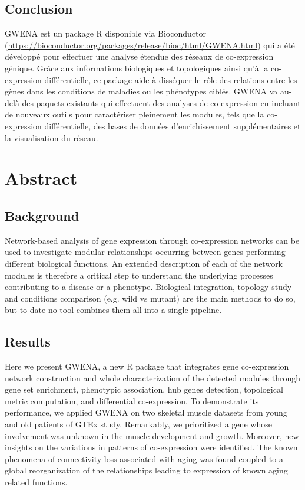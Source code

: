 \subsection{Conclusion}
GWENA est un package R disponible via Bioconductor (\url{https://bioconductor.org/packages/release/bioc/html/GWENA.html}) qui a été développé pour effectuer une analyse étendue des réseaux de co-expression génique. Grâce aux informations biologiques et topologiques ainsi qu'à la co-expression différentielle, ce package aide à disséquer le rôle des relations entre les gènes dans les conditions de maladies ou les phénotypes ciblés. GWENA va au-delà des paquets existants qui effectuent des analyses de co-expression en incluant de nouveaux outils pour caractériser pleinement les modules, tels que la co-expression différentielle, des bases de données d'enrichissement supplémentaires et la visualisation du réseau.



\section{Abstract}
\subsection{Background}
Network-based analysis of gene expression through co-expression networks can be used to investigate modular relationships occurring between genes performing different biological functions. An extended description of each of the network modules is therefore a critical step to understand the underlying processes contributing to a disease or a phenotype. Biological integration, topology study and conditions comparison (e.g. wild vs mutant) are the main methods to do so, but to date no tool combines them all into a single pipeline.

\subsection{Results}
Here we present GWENA, a new R package that integrates gene co-expression network construction and whole characterization of the detected modules through gene set enrichment, phenotypic association, hub genes detection, topological metric computation, and differential co-expression. To demonstrate its performance, we applied GWENA on two skeletal muscle datasets from young and old patients of GTEx study. Remarkably, we prioritized a gene whose involvement was unknown in the muscle development and growth. Moreover, new insights on the variations in patterns of co-expression were identified. The known phenomena of connectivity loss associated with aging was found coupled to a global reorganization of the relationships leading to expression of known aging related functions.

